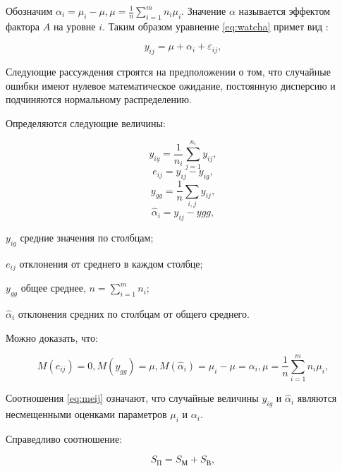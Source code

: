 Обозначим $\alpha_i=\mu_i-\mu, \mu=\frac{1}{n}\sum_{i=1}^{m}{n_i\mu_i}$. Значение $\alpha$ называется эффектом фактора $A$ на уровне $i$. Таким образом уравнение \eqref{eq:watcha} примет вид \cite{disperMethod}:

\begin{equation}
\label{eq:watcha}
y_{ij} = \mu+\alpha_i+\varepsilon_{ij},
\end{equation}


Следующие рассуждения строятся на предположении о том, что случайные ошибки имеют нулевое математическое ожидание, постоянную дисперсию и подчиняются нормальному распределению.

Определяются следующие величины:

\begin{equation}
\label{eq:yig}
y_{ig}=\frac{1}{n_i}\sum_{j=1}^{n_i}{y_{ij}},
\end{equation}
\begin{equation}
\label{eq:eij}
e_{ij}=y_{ij}-y_{ig},
\end{equation}
\begin{equation}
\label{eq:ygg}
y_{gg}=\frac{1}{n}\sum_{i,j}{y_{ij}},
\end{equation}
\begin{equation}
\label{eq:alphai}
\widehat{\alpha}_i=y_{ij}-y{gg},
\end{equation}
\begin{eqexpl}[15mm]
\item{$y_{ig}$} средние значения по столбцам;
\item{$e_{ij}$} отклонения от среднего в каждом столбце;
\item{$y_{gg}$} общее среднее, $n=\sum_{i=1}^{m}{n_i}$;
\item{$\widehat{\alpha}_i$} отклонения средних по столбцам от общего среднего.
\end{eqexpl}

Можно доказать, что:

\begin{equation}
\label{eq:meij}
M(e_{ij})=0,M(y_{gg})=\mu,M(\widehat{\alpha}_i)=\mu_i-\mu=\alpha_i, \mu=\frac{1}{n}\sum_{i=1}^{m}{n_i\mu_i},
\end{equation}

Соотношения \eqref{eq:meij} означают, что случайные величины $y_{ig}$ и $\widehat{\alpha}_i$ являются несмещенными оценками параметров $\mu_i$ и $\alpha_i$.

Справедливо соотношение:

\begin{equation}
\label{eq:spsum}
S_П=S_М+S_В,
\end{equation}

